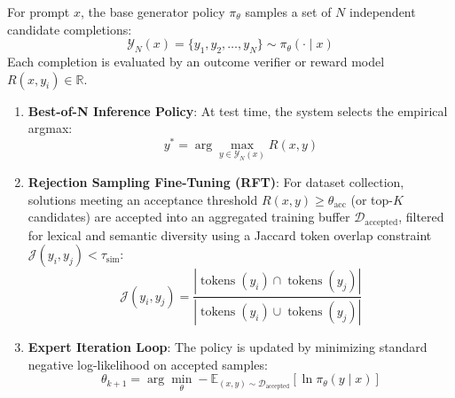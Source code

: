 \documentclass[11pt,a4paper]{article}
\theoremstyle{definition}
\begin{document}
For prompt $x$, the base generator policy $\pi_\theta$ samples a set of $N$ independent candidate completions:
{\boldmath
\begin{equation}
\mathcal{Y}_N(x) = \{y_1, y_2, \dots, y_N\} \sim \pi_\theta(\cdot \mid x)
\end{equation}
}
Each completion is evaluated by an outcome verifier or reward model $R(x, y_i) \in \mathbb{R}$.
\begin{enumerate}
    \item \textbf{Best-of-N Inference Policy}: At test time, the system selects the empirical argmax:
    {\boldmath
    \begin{equation}
    y^* = \arg\max_{y \in \mathcal{Y}_N(x)} R(x, y)
    \end{equation}
    }
    \item \textbf{Rejection Sampling Fine-Tuning (RFT)}: For dataset collection, solutions meeting an acceptance threshold $R(x, y) \ge \theta_{\text{acc}}$ (or top-$K$ candidates) are accepted into an aggregated training buffer $\mathcal{D}_{\text{accepted}}$, filtered for lexical and semantic diversity using a Jaccard token overlap constraint $\mathcal{J}(y_i, y_j) < \tau_{\text{sim}}$:
    {\boldmath
    \begin{equation}
    \mathcal{J}(y_i, y_j) = \frac{|\operatorname{tokens}(y_i) \cap \operatorname{tokens}(y_j)|}{|\operatorname{tokens}(y_i) \cup \operatorname{tokens}(y_j)|}
    \end{equation}
    }
    \item \textbf{Expert Iteration Loop}: The policy is updated by minimizing standard negative log-likelihood on accepted samples:
    {\boldmath
    \begin{equation}
    \theta_{k+1} = \arg\min_\theta - \mathbb{E}_{(x, y) \sim \mathcal{D}_{\text{accepted}}} \left[ \ln \pi_\theta(y \mid x) \right]
    \end{equation}
    }
\end{enumerate}
\end{document}
